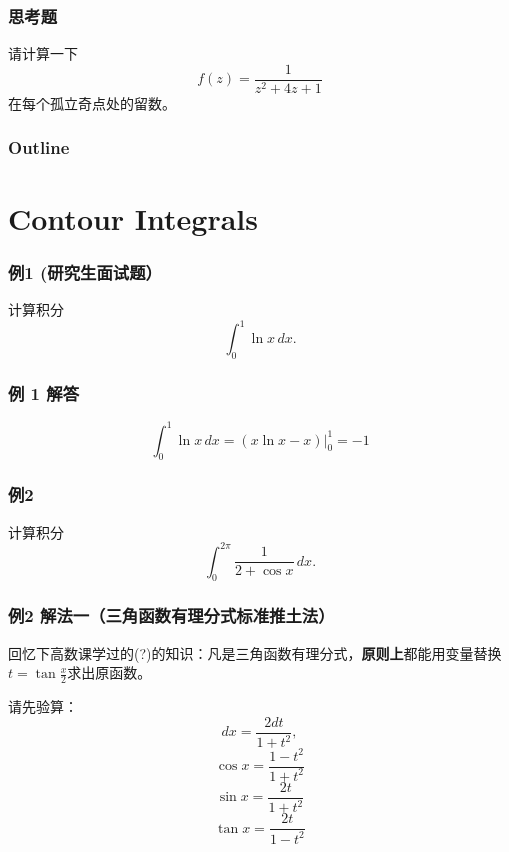 \documentclass[CJK]{beamer}
\date{}
\begin{document}
  \bch
  


\begin{frame}
  \frametitle{思考题}
  
  请计算一下$$f(z) = \frac{1}{z^2+4z+1}$$在每个孤立奇点处的留数。
  
\end{frame}


\begin{frame}
  \frametitle{Outline}
  
\tableofcontents

\end{frame}


\section{Contour Integrals}


\begin{frame}
  \frametitle{例1 (研究生面试题）}
  

  计算积分$$ \int_0^1 \ln x \, dx. $$
  
\end{frame}

\begin{frame}
  \frametitle{例 1 解答}
  
  $$\int_0^1 \ln x\,dx =\left. \left( x\ln x-x \right)\right\vert^{1}_0 = -1 $$

  
\end{frame}


\begin{frame}
  \frametitle{例2 }
  

  计算积分$$ \int_0^{2\pi}\frac{1}{2+\cos x} \, dx. $$
  
\end{frame}

\begin{frame}
  \frametitle{例2 解法一（三角函数有理分式标准推土法）}
  
    回忆下高数课学过的(?)的知识：{\blue 凡是三角函数有理分式，{\bf 原则上}都能用变量替换$t = \tan\frac{x}{2}$求出原函数。}

    请先验算：{\blue
    $$ dx = \frac{2dt}{1+t^2}, $$
    $$ \cos x = \frac{1-t^2}{1+t^2} $$
    $$ \sin x = \frac{2t}{1+t^2} $$    
    $$ \tan x = \frac{2t}{1-t^2} $$
    }
  
\end{frame}
\end{document}
